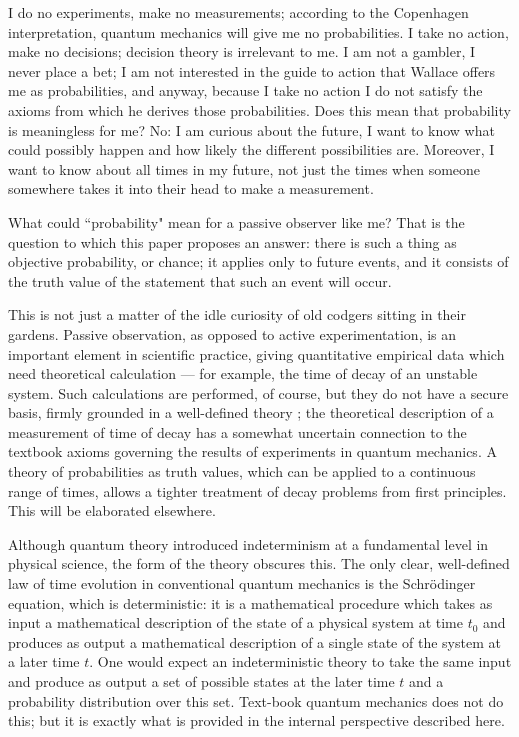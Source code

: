 \documentclass[12pt,a4paper,reqno]{article}
\renewcommand{\(}{\left(}
\renewcommand{\)}{\right)}
\newcommand{\<}{\langle}
\renewcommand{\>}{\rangle}
\theoremstyle{plain} %
\begin{document}
I do no experiments, make no measurements; according to the Copenhagen interpretation, quantum mechanics will give me no probabilities. I take no action, make no decisions; decision theory is irrelevant to me. I am not a gambler, I never place a bet; I am not interested in the guide to action that Wallace offers me as probabilities, and anyway, because I take no action I do not satisfy the axioms from which he derives those probabilities. Does this mean that probability is meaningless for me? No: I am curious about the future, I want to know what could possibly happen and how likely the different possibilities are. Moreover, I want to know about all times in my future, not just the times when someone somewhere takes it into their head to make a measurement.

What could ``probability" mean for a passive observer like me? That is the question to which this paper proposes an answer: there is such a thing as objective probability, or chance; it applies only to future events, and it consists of the truth value of the statement that such an event will occur.

This is not just a matter of the idle curiosity of old codgers sitting in their gardens. Passive observation, as opposed to active experimentation, is an important element in scientific practice, giving quantitative empirical data which need theoretical calculation --- for example, the time of decay of an unstable system. Such calculations are performed, of course, but they do not have a secure basis, firmly grounded in a well-defined theory \cite{verdammte}; the theoretical description of a measurement of time of decay \cite{obsdecay} has a somewhat uncertain connection to the textbook axioms governing the results of experiments in quantum mechanics. A theory of probabilities as truth values, which can be applied to a continuous range of times, allows a tighter treatment of decay problems from first principles. This will be elaborated elsewhere.

Although quantum theory introduced indeterminism at a fundamental level in physical science, the form of the theory obscures this. The only clear, well-defined law of time evolution in conventional quantum mechanics is the Schr\"odinger equation, which is deterministic: it is a mathematical procedure which takes as input a mathematical description of the state of a physical system at time $t_0$ and produces as output a mathematical description of a single state of the system at a later time $t$. One would expect an indeterministic theory to take the same input and produce as output a set of possible states at the later time $t$ and a probability distribution over this set. Text-book quantum mechanics does not do this; but it is exactly what is provided in the internal perspective described here.
 
\end{document}
